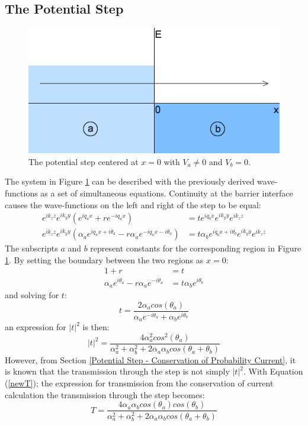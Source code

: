 \documentclass[12pt,a4paper]{article}
\begin{document}
		\subsection{The Potential Step}
		\begin{figure}
			\centerline{\includegraphics[scale=0.6]{images/weyl-step}}
			\caption{The potential step centered at $x=0$ with $V_{a}\neq 0$ and $V_{b}=0$.}
			\label{weyl-step}
		\end{figure}
		The system in Figure \ref{weyl-step} can be described with the previously derived wave-functions as a set of simultaneous equations. Continuity at the barrier interface causes the wave-functions on the left and right of the step to be equal:
		\begin{align}
			e^{ik_{z}z}e^{ik_{y}y}\left(e^{iq_{a}x}+re^{-iq_{a}x}\right)&=te^{iq_{b}x}e^{ik_{y}y}e^{ik_{z}z}\\
			e^{ik_{z}z}e^{ik_{y}y}\left(\alpha_{a}e^{iq_{a}x+i\theta_{a}}-r\alpha_{a}e^{-iq_{a}x-i\theta_{a}}\right)&=t\alpha_{b}e^{iq_{b}x+i\theta_{b}}e^{ik_{y}y}e^{ik_{z}z}
		\end{align}
		The subscripts $a$ and $b$ represent constants for the corresponding region in Figure \ref{weyl-step}. By setting the boundary between the two regions as $x=0$:
		\begin{align}
			1+r&=t\\
			\alpha_{a}e^{i\theta_{a}}-r\alpha_{a}e^{-i\theta_{a}}&=t\alpha_{b}e^{i\theta_{b}}
		\end{align}
		and solving for $t$:
		\begin{equation}
			t=\frac{2\alpha_{a}cos\left(\theta_{a}\right)}{\alpha_{a}e^{-i\theta_{a}}+\alpha_{b}e^{i\theta_{b}}}
		\end{equation}
		an expression for $|t|^{2}$ is then:
		\begin{equation}
			|t|^{2}=\frac{4\alpha_{a}^{2}cos^{2}\left(\theta_{a}\right)}{\alpha_{a}^{2}+\alpha_{b}^{2}+2\alpha_{a}\alpha_{b}cos\left(\theta_{a}+\theta_{b}\right)}
		\end{equation}
		However, from Section \ref{Potential Step - Conservation of Probability Current}, it is known that the transmission through the step is not simply $|t|^{2}$. With Equation (\ref{newT}); the expression for transmission from the conservation of current calculation the transmission through the step becomes:
		\begin{equation}
			T=\frac{4\alpha_{a}\alpha_{b}cos\left(\theta_{a}\right)cos\left(\theta_{b}\right)}{\alpha_{a}^{2}+\alpha_{b}^{2}+2\alpha_{a}\alpha_{b}cos\left(\theta_{a}+\theta_{b}\right)}
		\end{equation}
\end{document}
